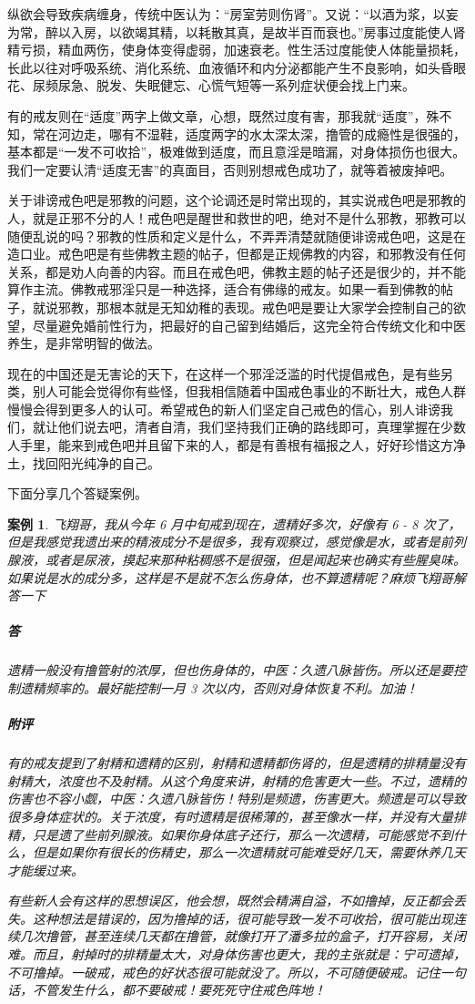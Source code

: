 \documentclass{ctexart}
\newtheorem{case}{案例}
\begin{document}
纵欲会导致疾病缠身，传统中医认为：“房室劳则伤肾”。又说：“以酒为浆，以妄为常，醉以入房，以欲竭其精，以耗散其真，是故半百而衰也。”房事过度能使人肾精亏损，精血两伤，使身体变得虚弱，加速衰老。性生活过度能使人体能量损耗，长此以往对呼吸系统、消化系统、血液循环和内分泌都能产生不良影响，如头昏眼花、尿频尿急、脱发、失眠健忘、心慌气短等一系列症状便会找上门来。

有的戒友则在“适度”两字上做文章，心想，既然过度有害，那我就“适度”，殊不知，常在河边走，哪有不湿鞋，适度两字的水太深太深，撸管的成瘾性是很强的，基本都是“一发不可收拾”，极难做到适度，而且意淫是暗漏，对身体损伤也很大。我们一定要认清“适度无害”的真面目，否则别想戒色成功了，就等着被废掉吧。

关于诽谤戒色吧是邪教的问题，这个论调还是时常出现的，其实说戒色吧是邪教的人，就是正邪不分的人！戒色吧是醒世和救世的吧，绝对不是什么邪教，邪教可以随便乱说的吗？邪教的性质和定义是什么，不弄弄清楚就随便诽谤戒色吧，这是在造口业。戒色吧是有些佛教主题的帖子，但都是正规佛教的内容，和邪教没有任何关系，都是劝人向善的内容。而且在戒色吧，佛教主题的帖子还是很少的，并不能算作主流。佛教戒邪淫只是一种选择，适合有佛缘的戒友。如果一看到佛教的帖子，就说邪教，那根本就是无知幼稚的表现。戒色吧是要让大家学会控制自己的欲望，尽量避免婚前性行为，把最好的自己留到结婚后，这完全符合传统文化和中医养生，是非常明智的做法。

现在的中国还是无害论的天下，在这样一个邪淫泛滥的时代提倡戒色，是有些另类，别人可能会觉得你有些怪，但我相信随着中国戒色事业的不断壮大，戒色人群慢慢会得到更多人的认可。希望戒色的新人们坚定自己戒色的信心，别人诽谤我们，就让他们说去吧，清者自清，我们坚持我们正确的路线即可，真理掌握在少数人手里，能来到戒色吧并且留下来的人，都是有善根有福报之人，好好珍惜这方净土，找回阳光纯净的自己。

下面分享几个答疑案例。

\begin{case}
    飞翔哥，我从今年 6 月中旬戒到现在，遗精好多次，好像有 6 - 8 次了，但是我感觉我遗出来的精液成分不是很多，我有观察过，感觉像是水，或者是前列腺液，或者是尿液，摸起来那种粘稠感不是很强，但是闻起来也确实有些腥臭味。如果说是水的成分多，这样是不是就不怎么伤身体，也不算遗精呢？麻烦飞翔哥解答一下
    \subparagraph{答} 遗精一般没有撸管射的浓厚，但也伤身体的，中医：久遗八脉皆伤。所以还是要控制遗精频率的。最好能控制一月 3 次以内，否则对身体恢复不利。加油！
    \subparagraph{附评} 有的戒友提到了射精和遗精的区别，射精和遗精都伤肾的，但是遗精的排精量没有射精大，浓度也不及射精。从这个角度来讲，射精的危害更大一些。不过，遗精的伤害也不容小觑，中医：久遗八脉皆伤！特别是频遗，伤害更大。频遗是可以导致很多身体症状的。关于浓度，有时遗精是很稀薄的，甚至像水一样，并没有大量排精，只是遗了些前列腺液。如果你身体底子还行，那么一次遗精，可能感觉不到什么，但是如果你有很长的伤精史，那么一次遗精就可能难受好几天，需要休养几天才能缓过来。

    有些新人会有这样的思想误区，他会想，既然会精满自溢，不如撸掉，反正都会丢失。这种想法是错误的，因为撸掉的话，很可能导致一发不可收拾，很可能出现连续几次撸管，甚至连续几天都在撸管，就像打开了潘多拉的盒子，打开容易，关闭难。而且，射掉时的排精量太大，对身体伤害也更大，我的主张就是：宁可遗掉，不可撸掉。一破戒，戒色的好状态很可能就没了。所以，不可随便破戒。记住一句话，不管发生什么，都不要破戒！要死死守住戒色阵地！
\end{case}
\end{document}
